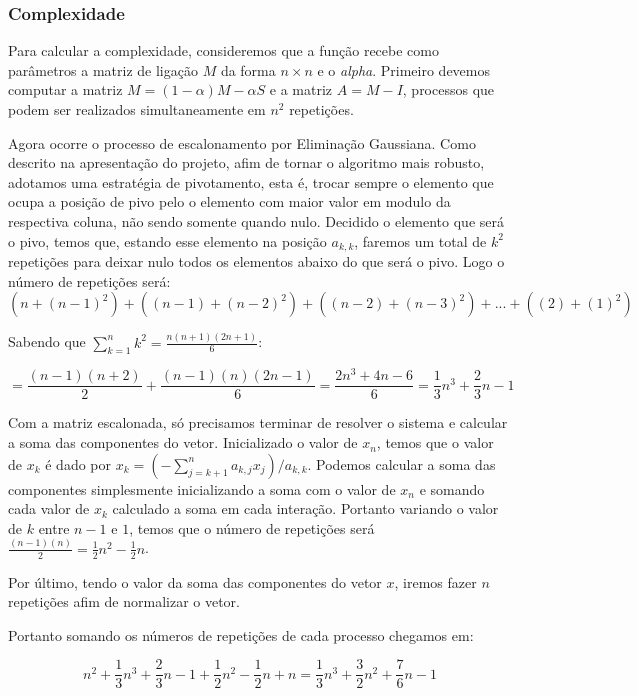 \documentclass[12pt]{article}
\begin{document}
    		
    	\subsubsection{Complexidade}
    		Para calcular a complexidade, consideremos que a função recebe como parâmetros a matriz de ligação $M$ da forma $n\times n$ e o \emph{alpha}. Primeiro devemos computar a matriz \hspace{3em} $M = (1-\alpha)M - \alpha S$ e a matriz $A = M-I$, processos que podem ser realizados simultaneamente em $n^2$ repetições. 
    		
    		Agora ocorre o processo de escalonamento por Eliminação Gaussiana. Como descrito na apresentação do projeto, afim de tornar o algoritmo mais robusto, adotamos uma estratégia de pivotamento, esta é, trocar sempre o elemento que ocupa a posição de pivo pelo o elemento com maior valor em modulo da respectiva coluna, não sendo somente quando nulo. Decidido o elemento que será o pivo, temos que, estando esse elemento na posição $a_{k,k}$, faremos um total de $k^2$ repetições para deixar nulo todos os elementos abaixo do que será o pivo. Logo o número de repetições será:
    		\[(n + (n-1)^2) + ((n-1) + (n-2)^2) + ((n-2) + (n-3)^2) + ... + ((2) + (1)^2)\]
    		
    		Sabendo que $\sum_{k=1}^n k^2 = \tfrac{n(n+1)(2n+1)}{6}$:
    		
    		\[ = \dfrac{(n-1)(n+2)}{2} + \dfrac{(n-1)(n)(2n-1)}{6} = \dfrac{2n^3 + 4n - 6}{6} = \dfrac{1}{3}n^3 + \dfrac{2}{3}n - 1\] 
    		
    		
    		Com a matriz escalonada, só precisamos terminar de resolver o sistema e calcular a soma das componentes do vetor. Inicializado o valor de $x_n$, temos que o valor de $x_k$ é dado por $x_k = (-\sum_{j=k+1}^{n}a_{k,j}x_j)/a_{k,k}$. Podemos calcular a soma das componentes simplesmente inicializando a soma com o valor de $x_n$ e somando cada valor de $x_k$ calculado a soma em cada interação. Portanto variando o valor de $k$ entre $n-1$ e $1$, temos que o número de repetições será $\tfrac{(n-1)(n)}{2} = \tfrac{1}{2}n^2 - \tfrac{1}{2}n$.
    		
    		Por último, tendo o valor da soma das componentes do vetor $x$, iremos fazer $n$ repetições afim de normalizar o vetor.
    		
    		Portanto somando os números de repetições de cada processo chegamos em:
    		
    			\[n^2 + \dfrac{1}{3}n^3 + \dfrac{2}{3}n - 1 + \dfrac{1}{2}n^2 - \dfrac{1}{2}n + n= \dfrac{1}{3}n^3 + \dfrac{3}{2}n^2 + \dfrac{7}{6}n - 1\]
    			
\end{document}
